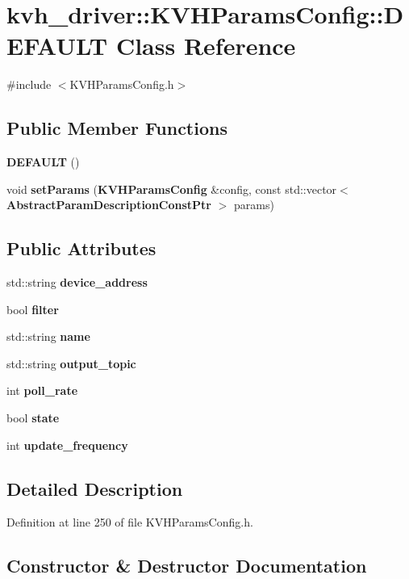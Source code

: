 \section{kvh\-\_\-driver\-:\-:\-K\-V\-H\-Params\-Config\-:\-:\-D\-E\-F\-A\-U\-L\-T \-Class \-Reference}
\label{classkvh__driver_1_1KVHParamsConfig_1_1DEFAULT}


{\ttfamily \#include $<$\-K\-V\-H\-Params\-Config.\-h$>$}

\subsection*{\-Public \-Member \-Functions}
\begin{DoxyCompactItemize}
\item 
{\bf \-D\-E\-F\-A\-U\-L\-T} ()
\item 
void {\bf set\-Params} ({\bf \-K\-V\-H\-Params\-Config} \&config, const std\-::vector$<$ {\bf \-Abstract\-Param\-Description\-Const\-Ptr} $>$ params)
\end{DoxyCompactItemize}
\subsection*{\-Public \-Attributes}
\begin{DoxyCompactItemize}
\item 
std\-::string {\bf device\-\_\-address}
\item 
bool {\bf filter}
\item 
std\-::string {\bf name}
\item 
std\-::string {\bf output\-\_\-topic}
\item 
int {\bf poll\-\_\-rate}
\item 
bool {\bf state}
\item 
int {\bf update\-\_\-frequency}
\end{DoxyCompactItemize}


\subsection{\-Detailed \-Description}


\-Definition at line 250 of file \-K\-V\-H\-Params\-Config.\-h.



\subsection{\-Constructor \& \-Destructor \-Documentation}
